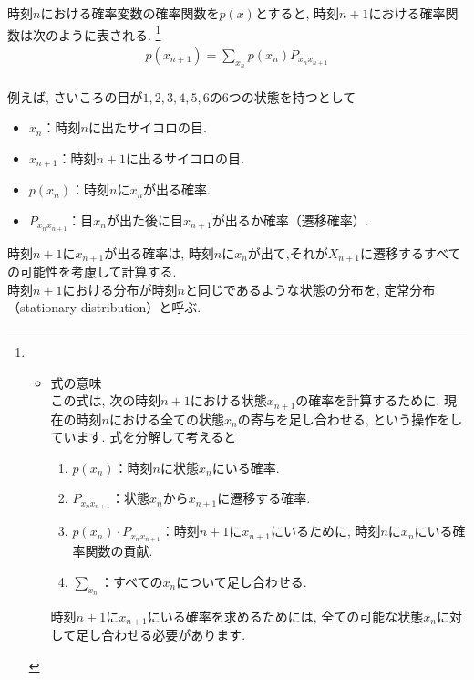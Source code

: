 \documentclass[a4j]{jsarticle}
\begin{document}
時刻$n$における確率変数の確率関数を$p(x)$とすると, 時刻$n+1$における確率関数は次のように表される.
\footnote{
	\begin{itemize}
		\item 式の意味\\
		      この式は, 次の時刻$n+1$における状態$x_{n+1}$の確率を計算するために, 現在の時刻$n$における全ての状態$x_n$の寄与を足し合わせる, という操作をしています. 式を分解して考えると
		      \begin{enumerate}
			      \item $p(x_n)$：時刻$n$に状態$x_n$にいる確率.
			      \item $P_{x_nx_{n+1}}$：状態$x_n$から$x_{n+1}$に遷移する確率.
			      \item $p(x_n) \cdot P_{x_nx_{n+1}}$：時刻$n+1$に$x_{n+1}$にいるために, 時刻$n$に$x_n$にいる確率関数の貢献.
			      \item $\sum_{x_n}$：すべての$x_n$について足し合わせる.
		      \end{enumerate}
		      時刻$n+1$に$x_{n+1}$にいる確率を求めるためには, 全ての可能な状態$x_n$に対して足し合わせる必要があります.
	\end{itemize}
}
\begin{align}
	p(x_{n+1}) = \sum_{x_n} p(x_n)P_{x_nx_{n+1}}
\end{align}\\

 例えば, さいころの目が$1, 2, 3, 4, 5, 6$の6つの状態を持つとして
\begin{itemize}
	\item $x_n$：時刻$n$に出たサイコロの目.
	\item $x_{n+1}$：時刻$n+1$に出るサイコロの目.
	\item $p(x_n)$：時刻$n$に$x_n$が出る確率.
	\item $P_{x_nx_{n+1}}$：目$x_n$が出た後に目$x_{n+1}$が出るか確率（遷移確率）.
\end{itemize}
時刻$n+1$に$x_{n+1}$が出る確率は, 時刻$n$に$x_n$が出て,それが$X_{n+1}$に遷移するすべての可能性を考慮して計算する.\\

 時刻$n+1$における分布が時刻$n$と同じであるような状態の分布を, 定常分布（stationary distribution）と呼ぶ.\\
\end{document}
